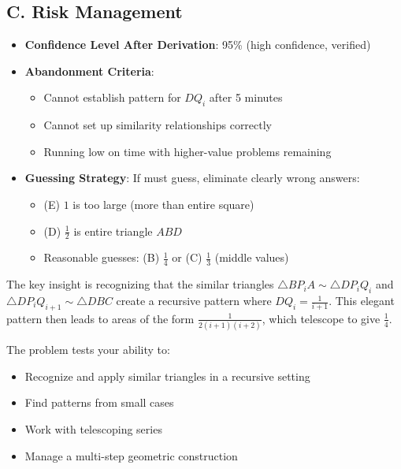 \documentclass[]{article}
\begin{document}
\begin{competitionbox}
\subsection*{C. Risk Management}
\begin{itemize}[leftmargin=*]
    \item \textbf{Confidence Level After Derivation}: 95\% (high confidence, verified)
    \item \textbf{Abandonment Criteria}:
    \begin{itemize}
        \item Cannot establish pattern for $DQ_i$ after 5 minutes
        \item Cannot set up similarity relationships correctly
        \item Running low on time with higher-value problems remaining
    \end{itemize}
    \item \textbf{Guessing Strategy}: If must guess, eliminate clearly wrong answers:
    \begin{itemize}
        \item (E) $1$ is too large (more than entire square)
        \item (D) $\frac{1}{2}$ is entire triangle $ABD$
        \item Reasonable guesses: (B) $\frac{1}{4}$ or (C) $\frac{1}{3}$ (middle values)
    \end{itemize}
\end{itemize}
\end{competitionbox}

\begin{keyinsightbox}
The key insight is recognizing that the similar triangles $\triangle BP_iA \sim \triangle DP_iQ_i$ and $\triangle DP_iQ_{i+1} \sim \triangle DBC$ create a recursive pattern where $DQ_i = \frac{1}{i+1}$. This elegant pattern then leads to areas of the form $\frac{1}{2(i+1)(i+2)}$, which telescope to give $\frac{1}{4}$.

The problem tests your ability to:
\begin{itemize}
    \item Recognize and apply similar triangles in a recursive setting
    \item Find patterns from small cases
    \item Work with telescoping series
    \item Manage a multi-step geometric construction
\end{itemize}
\end{keyinsightbox}
\end{document}
